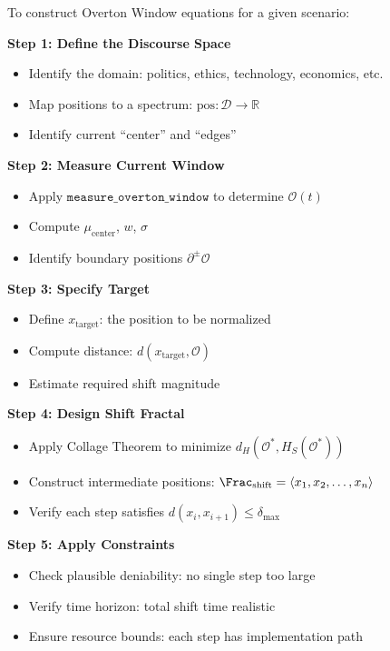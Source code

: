 \begin{tcolorbox}[colback=yellow!5!white,colframe=yellow!75!black,title=\textbf{Construction Algorithm},breakable]

To construct Overton Window equations for a given scenario:

\textbf{Step 1: Define the Discourse Space}
\begin{itemize}
    \item Identify the domain: politics, ethics, technology, economics, etc.
    \item Map positions to a spectrum: $\mathrm{pos} : \mathcal{D} \to \mathbb{R}$
    \item Identify current ``center'' and ``edges''
\end{itemize}

\textbf{Step 2: Measure Current Window}
\begin{itemize}
    \item Apply $\mathtt{measure\_overton\_window}$ to determine $\mathcal{O}(t)$
    \item Compute $\mu_{\mathrm{center}}$, $w$, $\sigma$
    \item Identify boundary positions $\partial^{\pm}\mathcal{O}$
\end{itemize}

\textbf{Step 3: Specify Target}
\begin{itemize}
    \item Define $x_{\mathrm{target}}$: the position to be normalized
    \item Compute distance: $d(x_{\mathrm{target}}, \mathcal{O})$
    \item Estimate required shift magnitude
\end{itemize}

\textbf{Step 4: Design Shift Fractal}
\begin{itemize}
    \item Apply Collage Theorem to minimize $d_H(\mathcal{O}^*, H_S(\mathcal{O}^*))$
    \item Construct intermediate positions: $\Frac_{\mathrm{shift}} =
          \langle x_1, x_2, \ldots, x_n \rangle$
    \item Verify each step satisfies $d(x_i, x_{i+1}) \leq \delta_{\max}$
\end{itemize}

\textbf{Step 5: Apply Constraints}
\begin{itemize}
    \item Check plausible deniability: no single step too large
    \item Verify time horizon: total shift time realistic
    \item Ensure resource bounds: each step has implementation path
\end{itemize}


\end{tcolorbox}
